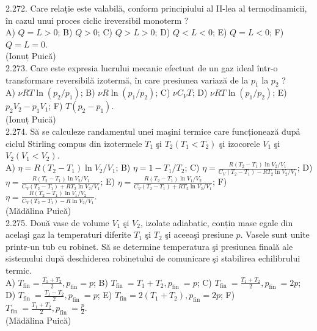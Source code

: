2.272. Care relație este valabilă, conform principiului al II-lea al termodinamicii, în cazul unui proces ciclic ireversibil monoterm ?\\ A) $Q=L>0$; B) $Q>0$; C) $Q>L>0$; D) $Q<L<0$; E) $Q=L<0$; F) $Q=L=0$.\\ (Ionuț Puică)\\

2.273. Care este expresia lucrului mecanic efectuat de un gaz ideal într-o transformare reversibilă izotermă, în care presiunea variază de la $p_{1}$ la $p_{2}$ ?\\ A) $\nu R T \ln \left(p_{2} / p_{1}\right)$; B) $\nu R \ln \left(p_{1} / p_{2}\right)$; C) $\nu C_{V} T$; D) $\nu R T \ln \left(p_{1} / p_{2}\right)$; E) $p_{2} V_{2}-p_{1} V_{1}$; F) $T\left(p_{2}-p_{1}\right)$.\\ (Ionuț Puică)\\

2.274. Să se calculeze randamentul unei maşini termice care funcționează đupả ciclul Stirling compus din izotermele $T_{1}$ şi $T_{2}\left(T_{1}<T_{2}\right)$ şi izocorele $V_{1}$ şi $V_{2}\left(V_{1}<V_{2}\right)$.\\ A) $\eta=R\left(T_{2}-T_{1}\right) \ln V_{2} / V_{1}$; B) $\eta=1-T_{1} / T_{2}$; C) $\eta=\frac{R\left(T_{2}-T_{1}\right) \ln V_{2} / V_{1}}{C_{V}\left(T_{2}-T_{1}\right)-R T_{2} \ln V_{2} / V_{1}}$; D) $\eta=\frac{R\left(T_{2}-T_{1}\right) \ln V_{2} / V_{1}}{C_{V}\left(T_{2}-T_{1}\right)+R T_{2} \ln V_{2} / V_{1}}$; E) $\eta=\frac{R\left(T_{2}-T_{1}\right) \ln V_{1} / V_{2}}{C_{V}\left(T_{2}-T_{1}\right)+R T_{2} \ln V_{2} / V_{1}}$; F) $\eta=\frac{R\left(T_{2}-T_{1}\right) \ln V_{1} / V_{2}}{C_{V}\left(T_{2}-T_{1}\right)-R \ln V_{2} / V_{1}}$.\\ (Mădălina Puică)\\

2.275. Două vase de volume $V_{1}$ şi $V_{2}$, izolate adiabatic, conțin mase egale din acelaşi gaz la temperaturi diferite $T_{1}$ şi $T_{2}$ şi aceeaşi presiune $p$. Vasele sunt unite printr-un tub cu robinet. Să se determine temperatura şi presiunea finală ale sistemului după deschiderea robinetului de comunicare şi stabilirea echilibrului termic.\\ A) $T_{\mathrm{fin}}=\frac{T_{1}+T_{2}}{2}, p_{\mathrm{fin}}=p$; B) $T_{\text {fin }}=T_{1}+T_{2}, p_{\text {fin }}=p$; C) $T_{\text {fin }}=\frac{T_{1}+T_{2}}{2}, p_{\text {fin }}=2 p$; D) $T_{\text {fin }}=\frac{T_{1}-T_{2}}{2}, p_{\text {fin }}=p$; E) $T_{\mathrm{fin}}=2\left(T_{1}+T_{2}\right), p_{\mathrm{fin}}=2 p$; F) $T_{\text {fin }}=\frac{T_{1}+T_{2}}{2}, p_{\text {fin }}=\frac{p}{2}$.\\ (Mădălina Puică)\\

